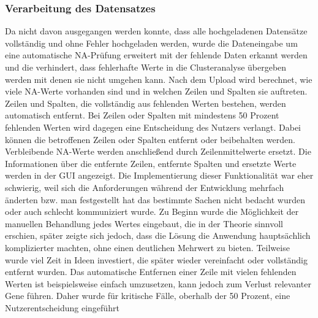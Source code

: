 \documentclass[12pt]{article}
\begin{document}
\subsubsection{Verarbeitung des Datensatzes}
\label{Verarbeitung des Datensatzes}
Da nicht davon ausgegangen werden konnte, dass alle hochgeladenen Datensätze vollständig und ohne Fehler hochgeladen werden, wurde die Dateneingabe um eine automatische NA-Prüfung erweitert mit der fehlende Daten erkannt werden und die verhindert, dass fehlerhafte Werte in die Clusteranalyse übergeben werden mit denen sie nicht umgehen kann. Nach dem Upload wird berechnet, wie viele NA-Werte vorhanden sind und in welchen Zeilen und Spalten sie auftreten. Zeilen und Spalten, die vollständig aus fehlenden Werten bestehen, werden automatisch entfernt. Bei Zeilen oder Spalten mit mindestens 50 Prozent fehlenden Werten wird dagegen eine Entscheidung des Nutzers verlangt. Dabei können die betroffenen Zeilen oder Spalten entfernt oder beibehalten werden. Verbleibende NA-Werte werden anschließend durch Zeilenmittelwerte ersetzt. Die Informationen über die entfernte Zeilen, entfernte Spalten und ersetzte Werte werden in der GUI angezeigt. Die Implementierung dieser Funktionalität war eher schwierig, weil sich die Anforderungen während der Entwicklung mehrfach änderten bzw. man festgestellt hat das bestimmte Sachen nicht bedacht wurden oder auch schlecht kommuniziert wurde. Zu Beginn wurde die Möglichkeit der manuellen Behandlung jedes Wertes eingebaut, die in der Theorie sinnvoll erschien, später zeigte sich jedoch, dass die Lösung die Anwendung hauptsächlich komplizierter machten, ohne einen deutlichen Mehrwert zu bieten. Teilweise wurde viel Zeit in Ideen investiert, die später wieder vereinfacht oder vollständig entfernt wurden. Das automatische Entfernen einer Zeile mit vielen fehlenden Werten ist beispielsweise einfach umzusetzen, kann jedoch zum Verlust relevanter Gene führen. Daher wurde für kritische Fälle, oberhalb der 50 Prozent, eine Nutzerentscheidung eingeführt
\end{document}
